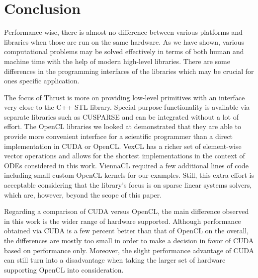 \documentclass[final]{siamltex}
\begin{document}
%









%
%
\section{Conclusion}

Performance-wise, there is almost no difference between various platforms and
libraries when those are run on the same hardware. As we have shown, various
computational problems may be solved effectively in terms of both human and
machine time with the help of modern high-level libraries.  There are some
differences in the programming interfaces of the libraries which may be crucial
for ones specific application.

The focus of Thrust is more on providing low-level primitives with an interface
very close to the C++ STL library.
Special purpose functionality is available via separate libraries such as CUSPARSE
and can be integrated without a lot of effort.
The OpenCL libraries we looked at demonstrated that they are able to
provide more convenient interface for a scientific programmer than a direct
implementation in CUDA or OpenCL.
VexCL has a richer set of element-wise vector operations and allows for the
shortest implementations in the context of ODEs considered in this work.
ViennaCL required a few additional lines of code including small custom OpenCL kernels for our examples.
Still, this extra effort is acceptable considering that the library's focus is on sparse linear systems solvers,
which are, however, beyond the scope of this paper.

Regarding a comparison of CUDA versus OpenCL, the main difference observed in this work is the wider range of hardware supported.
Although performance obtained via CUDA is a few percent better than that of OpenCL on the overall,
the differences are mostly too small in order to make a decision in favor of CUDA based on performance only.
Moreover, the slight performance advantage of CUDA can still turn into a disadvantage when taking the larger set of hardware supporting OpenCL into consideration.
\end{document}
